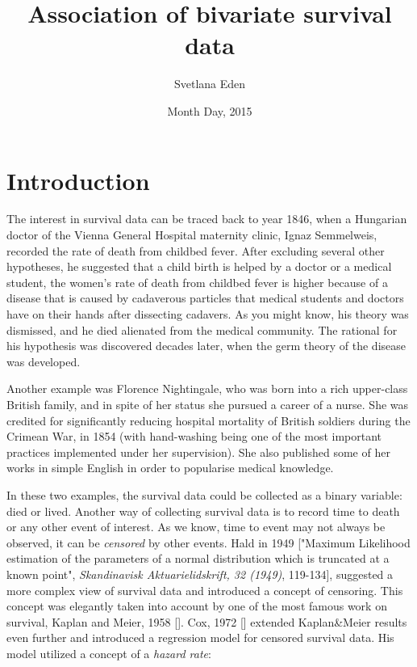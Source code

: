 \documentclass[]{article}
\title{Association of bivariate survival data}
\author{Svetlana Eden}
\date{Month Day, 2015}
\begin{document}
\maketitle
\tableofcontents
\listoffigures
\listoftables
\clearpage

\section{Introduction}
The interest in survival data can be traced back to year 1846, when a Hungarian doctor of the Vienna General Hospital maternity clinic, Ignaz Semmelweis, recorded the rate of death from childbed fever. After excluding several other hypotheses, he suggested that a child birth is helped by a doctor or a medical student, the women's rate of death from childbed fever is higher because of a disease that is caused by cadaverous particles that medical students and doctors have on their hands after dissecting cadavers. As you might know, his theory was dismissed, and he died alienated from the medical community. The rational for his hypothesis was discovered decades later, when the germ theory of the disease was developed.


Another example was Florence Nightingale, who was born into a rich upper-class British family, and in spite of her status she pursued a career of a nurse. She was credited for significantly reducing hospital mortality of British soldiers during the Crimean War, in 1854 (with hand-washing being one of the most important practices implemented under her supervision). She also published some of her works in simple English in order to popularise medical knowledge.
 

In these two examples, the survival data could be collected as a binary variable: died or lived.  Another way of collecting survival data is to record time to death or any other event of interest. As we know, time to event may not always be observed, it can be \emph{censored} by other events. Hald in 1949 ["Maximum Likelihood estimation of the parameters of a normal distribution which is truncated at a known point", \emph{Skandinavisk Aktuarielidskrift, 32 (1949)}, 119-134], suggested a more complex view of survival data and introduced a concept of censoring. This concept was elegantly taken into account by one of the most famous work on survival, Kaplan and Meier, 1958 [\cite{kaplan1958nonparametric}]. Cox, 1972 [\cite{cox1992regression}] extended Kaplan\&Meier results even further and introduced a regression model for censored survival data. His model utilized a concept of a \emph{hazard rate}:
\end{document}
